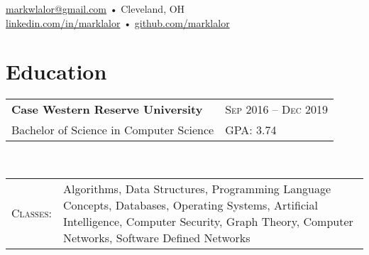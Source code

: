 \documentclass[a4paper,11pt]{article}
\begin{document}
\pagestyle{empty} %

\par{\par}
\begin{center}
\href{mailto:markwlalor@gmail.com}{markwlalor@gmail.com} • Cleveland, OH \\
\href{https://linkedin.com/in/marklalor/}{linkedin.com/in/marklalor} • \href{http://github.com/marklalor}{github.com/marklalor}
\end{center}


\section{Education}
\begin{tabular}{lp{15cm}}
\textbf{Case Western Reserve University} & \textsc{Sep} 2016 -- \textsc{Dec} 2019 \\
Bachelor of Science in Computer Science &  \textsc{GPA}: 3.74\\
\end{tabular} \\
\begin{tabular}{rp{16cm}}
\textsc{Classes}: & \footnotesize{Algorithms, Data Structures, Programming Language Concepts, Databases, Operating Systems, Artificial Intelligence,  Computer Security, Graph Theory, Computer Networks, Software Defined Networks}
\end{tabular}
\end{document}
